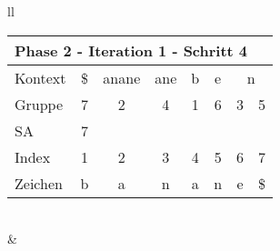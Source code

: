 \begin{table}[H]
\begin{adjustbox}{max width=\textwidth}
\begin{tabular}{ll}
\begin{tabular}{lccccccc}
\multicolumn{8}{l}{Phase 2 - Iteration 1 - Schritt 4}                                                                                                                                                                                                \\ \hline
\multicolumn{1}{l|}{Kontext} & \multicolumn{1}{c|}{\cellcolor[HTML]{\green}\$} & \multicolumn{1}{c|}{anane} & \multicolumn{1}{c|}{ane} & \multicolumn{1}{c|}{b}    & \multicolumn{1}{c|}{e} & \multicolumn{2}{c}{n}  \\
\multicolumn{1}{l|}{Gruppe}  & \multicolumn{1}{c|}{\cellcolor[HTML]{\green}7}  & \multicolumn{1}{c|}{2}     & \multicolumn{1}{c|}{4}   & \multicolumn{1}{c|}{1}    & \multicolumn{1}{c|}{6} & 3                         & 5                          \\ 
\multicolumn{1}{l|}{SA}      & \multicolumn{1}{c|}{\cellcolor[HTML]{\green}7}  & \multicolumn{1}{c|}{}      & \multicolumn{1}{c|}{}    & \multicolumn{1}{c|}{}     & \multicolumn{1}{c|}{}  &                           &                            \\ \hline
\multicolumn{1}{l|}{Index}   & 1                                               & \cellcolor[HTML]{\red}2  & 3                        & \cellcolor[HTML]{\red}4 & 5                      & \cellcolor[HTML]{\blue}6 & \cellcolor[HTML]{\green}7  \\
\multicolumn{1}{l|}{Zeichen} & b                                               & \cellcolor[HTML]{\red}a  & n                        & \cellcolor[HTML]{\red}a & n                      & \cellcolor[HTML]{\blue}e & \cellcolor[HTML]{\green}\$
\end{tabular}

\\
&
\\


\end{tabular}
\end{adjustbox}
\end{table}
